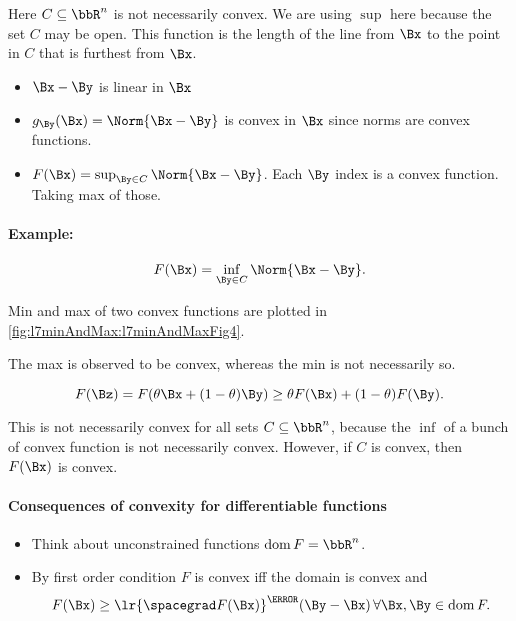 
Here \( C \subseteq \bbR^n \) is not necessarily convex.  We are using \( \sup \) here because the set \( C \) may be open.  This function is the length of the line from \( \Bx \) to the point in \( C \) that is furthest from \( \Bx \).

\begin{itemize}
\item \( \Bx - \By \) is linear in \( \Bx \)
\item \( g_\By(\Bx) = \Norm{\Bx - \By} \) is convex in \( \Bx \) since norms are convex functions.
\item \( F(\Bx) = \sup_{\By \in C} \Norm{ \Bx -  \By } \).  Each \( \By \) index is a convex function.  Taking max of those.
\end{itemize}

\paragraph{Example:}

\begin{dmath}\label{eqn:convexOptimizationLecture7:600}
F(\Bx) = \inf_{\By \in C} \Norm{ \Bx -  \By }.
\end{dmath}

Min and max of two convex functions are plotted in
\cref{fig:l7minAndMax:l7minAndMaxFig4}.

The max is observed to be convex, whereas the min is not necessarily so.

\begin{dmath}\label{eqn:convexOptimizationLecture7:800}
F(\Bz) = F(\theta \Bx + (1-\theta) \By) \ge \theta F(\Bx) + (1-\theta)F(\By).
\end{dmath}

This is not necessarily convex for all sets \( C \subseteq \bbR^n \), because the \( \inf \) of a bunch of convex function is not necessarily convex.  However, if \( C \) is convex, then \( F(\Bx) \) is convex.

\paragraph{Consequences of convexity for differentiable functions}

\begin{itemize}
\item Think about unconstrained functions \( \dom F = \bbR^n \).
\item By first order condition \( F \) is convex iff the domain is convex and
\begin{equation}\label{eqn:convexOptimizationLecture7:620}
F(\Bx) \ge \lr{ \spacegrad F(\Bx)}^\T (\By - \Bx) \, \forall \Bx, \By \in \dom F.
\end{equation}
\end{itemize}

